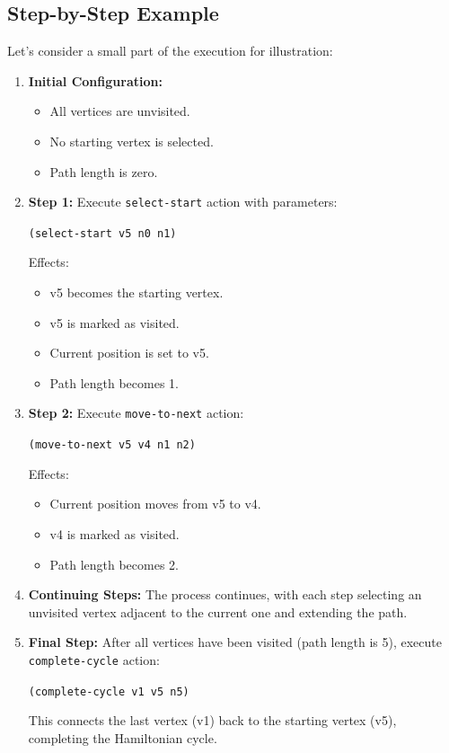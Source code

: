 \documentclass[a4paper,11pt]{article}
\begin{document}
\subsection{Step-by-Step Example}
Let's consider a small part of the execution for illustration:
\begin{enumerate}
    \item \textbf{Initial Configuration:}
    \begin{itemize}
        \item All vertices are unvisited.
        \item No starting vertex is selected.
        \item Path length is zero.
    \end{itemize}
    \item \textbf{Step 1:}  
    Execute \texttt{select-start} action with parameters:
    \begin{center}
        \texttt{(select-start v5 n0 n1)}
    \end{center}
    Effects:
    \begin{itemize}
        \item v5 becomes the starting vertex.
        \item v5 is marked as visited.
        \item Current position is set to v5.
        \item Path length becomes 1.
    \end{itemize}
    \item \textbf{Step 2:}  
    Execute \texttt{move-to-next} action:
    \begin{center}
        \texttt{(move-to-next v5 v4 n1 n2)}
    \end{center}
    Effects:
    \begin{itemize}
        \item Current position moves from v5 to v4.
        \item v4 is marked as visited.
        \item Path length becomes 2.
    \end{itemize}
    \item \textbf{Continuing Steps:}  
    The process continues, with each step selecting an unvisited vertex adjacent to the current one and extending the path.
    \item \textbf{Final Step:}  
    After all vertices have been visited (path length is 5), execute \texttt{complete-cycle} action:
    \begin{center}
        \texttt{(complete-cycle v1 v5 n5)}
    \end{center}
    This connects the last vertex (v1) back to the starting vertex (v5), completing the Hamiltonian cycle.
\end{enumerate}
\end{document}
